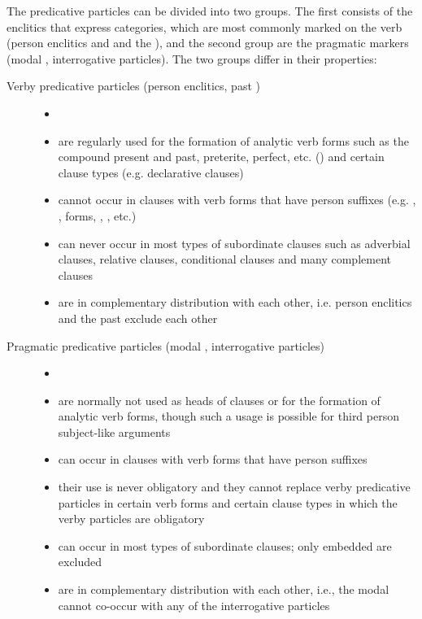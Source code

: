 The predicative particles can be divided into two groups. The first consists of the enclitics that express categories, which are most commonly marked on the verb (person enclitics  and  and the   ), and the second group are the pragmatic markers (modal , interrogative particles). The two groups differ in their properties:

\begin{description}
\item[Verby predicative particles (person enclitics, past )]
\begin{itemize}[leftmargin=*]
    \item[]
	\item	are regularly used for the formation of analytic verb forms such as the compound present and past, preterite, perfect, etc. () and certain clause types (e.g. declarative  clauses)
	\item	cannot occur in clauses with verb forms that have person suffixes (e.g. , ,  forms, , , etc.)
	\item	can never occur in most types of subordinate clauses such as adverbial clauses, relative clauses, conditional clauses and many complement clauses
	\item	are in complementary distribution with each other, i.e. person enclitics and the past  exclude each other
\end{itemize}

\item[Pragmatic predicative particles (modal , interrogative particles)]

\begin{itemize}[leftmargin=*]
    \item[]
	\item	are normally not used as heads of  clauses or for the formation of analytic verb forms, though such a usage is possible for third person subject-like arguments
	\item	can occur in clauses with verb forms that have person suffixes
	\item their use is never obligatory	and they cannot replace verby predicative particles in certain verb forms and certain clause types in which the verby particles are obligatory
	\item can occur in most types of subordinate clauses; only embedded  are excluded
	\item	are in complementary distribution with each other, i.e., the modal  cannot co-occur with any of the interrogative particles
\end{itemize}
\end{description}

